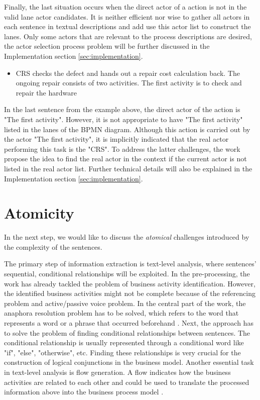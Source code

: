 Finally, the last situation occurs when the direct actor of a action is not in the valid lane actor candidates. It is neither efficient nor wise to gather all actors in each sentence in textual descriptions and add use this actor list to construct the lanes. Only some actors that are relevant to the process descriptions are desired, the actor selection process problem will be further discussed in the Implementation section \ref{sec:implementation}.

\begin{itemize}
	\item CRS checks the defect and hands out a repair cost calculation back. The ongoing repair consists of two activities. The first activity is to check and repair the hardware
\end{itemize}

In the last sentence from the example above, the direct actor of the action is "The first activity". However, it is not appropriate to have "The first activity" listed in the lanes of the BPMN diagram. Although this action is carried out by the actor "The first activity", it is implicitly indicated that the real actor performing this task is the "CRS". To address the latter challenges, the work propose the idea to find the real actor in the context if the current actor is not listed in the real actor list. Further technical details will also be explained in the Implementation section \ref{sec:implementation}.



\section{Atomicity}

In the next step, we would like to discuss the \textit{atomical} challenges introduced by the complexity of the sentences. 










The primary step of information extraction is text-level analysis, where sentences' sequential, conditional relationships will be exploited. In the pre-processing, the work has already tackled the problem of business activity identification. However, the identified business activities might not be complete because of the referencing problem and active/passive voice problem. In the central part of the work, the anaphora resolution problem has to be solved, which refers to the word that represents a word or a phrase that occurred beforehand \cite{literature_review_4}. Next, the approach has to solve the problem of finding conditional relationships between sentences. The conditional relationship is usually represented through a conditional word like "if", "else", "otherwise", etc. Finding these relationships is very crucial for the construction of logical conjunctions in the business model. Another essential task in text-level analysis is flow generation. A flow indicates how the business activities are related to each other and could be used to translate the processed information above into the business process model \cite{t2m_1}.


